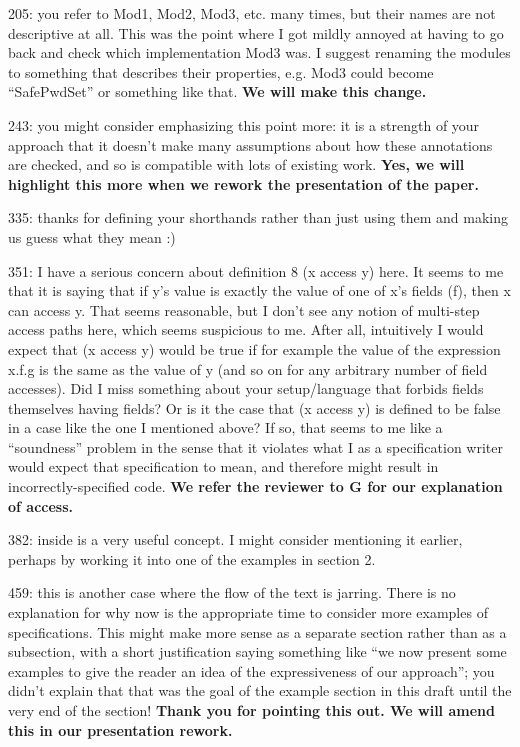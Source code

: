 \documentclass[11pt]{amsart}
\newcommand{\us}[1]{\bf #1}
\begin{document}
205: you refer to Mod1, Mod2, Mod3, etc. many times, but their names are not descriptive at all. This was the point where I got mildly annoyed at having to go back and check which implementation Mod3 was. I suggest renaming the modules to something that describes their properties, e.g. Mod3 could become “SafePwdSet” or something like that.
{\us{We will make this change.}}

243: you might consider emphasizing this point more: it is a strength of your approach that it doesn’t make many assumptions about how these annotations are checked, and so is compatible with lots of existing work.
{\us{Yes, we will highlight this more when we rework the presentation of the paper.}}

335: thanks for defining your shorthands rather than just using them and making us guess what they mean :)

351: I have a serious concern about definition 8 (x access y) here. It seems to me that it is saying that if y’s value is exactly the value of one of x’s fields (f), then x can access y. That seems reasonable, but I don’t see any notion of multi-step access paths here, which seems suspicious to me. After all, intuitively I would expect that (x access y) would be true if for example the value of the expression x.f.g is the same as the value of y (and so on for any arbitrary number of field accesses). Did I miss something about your setup/language that forbids fields themselves having fields? Or is it the case that (x access y) is defined to be false in a case like the one I mentioned above? If so, that seems to me like a “soundness” problem in the sense that it violates what I as a specification writer would expect that specification to mean, and therefore might result in incorrectly-specified code.
{\us{We refer the reviewer to G for our explanation of access.}}

382: inside is a very useful concept. I might consider mentioning it earlier, perhaps by working it into one of the examples in section 2.

459: this is another case where the flow of the text is jarring. There is no explanation for why now is the appropriate time to consider more examples of specifications. This might make more sense as a separate section rather than as a subsection, with a short justification saying something like “we now present some examples to give the reader an idea of the expressiveness of our approach”; you didn’t explain that that was the goal of the example section in this draft until the very end of the section!
{\us{Thank you for pointing this out. We will amend this in our presentation rework.}}
\end{document}
